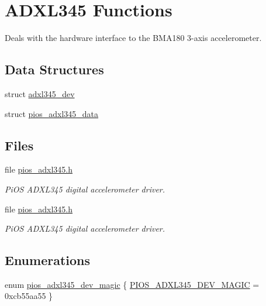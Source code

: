 \hypertarget{group___p_i_o_s___a_d_x_l345}{\section{\-A\-D\-X\-L345 \-Functions}
\label{group___p_i_o_s___a_d_x_l345}
}


\-Deals with the hardware interface to the \-B\-M\-A180 3-\/axis accelerometer.  


\subsection*{\-Data \-Structures}
\begin{DoxyCompactItemize}
\item 
struct \hyperlink{structadxl345__dev}{adxl345\-\_\-dev}
\item 
struct \hyperlink{structpios__adxl345__data}{pios\-\_\-adxl345\-\_\-data}
\end{DoxyCompactItemize}
\subsection*{\-Files}
\begin{DoxyCompactItemize}
\item 
file \hyperlink{pios__adxl345_8h}{pios\-\_\-adxl345.\-h}
\begin{DoxyCompactList}\small\item\em \-Pi\-O\-S \-A\-D\-X\-L345 digital accelerometer driver. \end{DoxyCompactList}\item 
file \hyperlink{pios__adxl345_8h}{pios\-\_\-adxl345.\-h}
\begin{DoxyCompactList}\small\item\em \-Pi\-O\-S \-A\-D\-X\-L345 digital accelerometer driver. \end{DoxyCompactList}\end{DoxyCompactItemize}
\subsection*{\-Enumerations}
\begin{DoxyCompactItemize}
\item 
enum \hyperlink{group___p_i_o_s___a_d_x_l345_ga2f1fd1a4af16c722d816221da8924b5c}{pios\-\_\-adxl345\-\_\-dev\-\_\-magic} \{ \hyperlink{group___p_i_o_s___a_d_x_l345_gga2f1fd1a4af16c722d816221da8924b5cab73bd0af0ffc1314313bd59dbcfefaeb}{\-P\-I\-O\-S\-\_\-\-A\-D\-X\-L345\-\_\-\-D\-E\-V\-\_\-\-M\-A\-G\-I\-C} =  0xcb55aa55
 \}
\end{DoxyCompactItemize}
